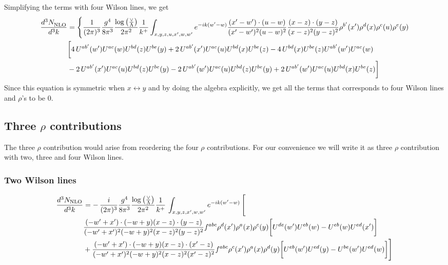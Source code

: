\documentclass[aps,prd,amsmath,amssymb,nofootinbib]{revtex4-2}
\numberwithin{equation}{section}
\begin{document}
Simplifying the terms with four Wilson lines, we get
\begin{align}
       \frac{d^{3}N_{\rm NLO}^{\rm}}{d^{3}k}  & =  \Bigg\{\frac{1}{(2\pi)^{3}}\frac{g^{4}}{8\pi^{3}}\frac{\log{\left(\frac{\vee}{\Lambda}\right)}}{2\pi^{2}} \frac{1}{k^{+}}\int_{x,y,z,u,x^{\prime},w,w^{\prime}}e^{-ik(w^{\prime}-w)}\frac{(x^{\prime}-w^{\prime})\cdot (u-w)}{(x^{\prime}-w^{\prime})^{2} (u-w)^{2}} \frac{(x-z)\cdot (y-z)}{(x-z)^{2}(y-z)^{2}}\rho^{b'}(x') \rho^{d}(x) \rho^{c}(u) \rho^{e}(y)\notag \\ & \bigg[4\,U^{ab'}(w')U^{ac}(w)U^{bd}(z)U^{be}(y)+2\,U^{ab'}(x')U^{ac}(u)U^{bd}(x)U^{be}(z)-4\,U^{bd}(x)U^{be}(z)U^{ab'}(w')U^{ac}(w)\notag \\ & -2\,U^{ab'}(x')U^{ac}(u)U^{bd}(z)U^{be}(y)-2\,U^{ab'}(w')U^{ac}(u)U^{bd}(z)U^{be}(y)+2\,U^{ab'}(w')U^{ac}(u)U^{bd}(x)U^{be}(z)\bigg]
\end{align}
Since this equation is symmetric when $x\leftrightarrow y$ and by doing the algebra explicitly, we get all the terms that corresponds to four Wilson lines and $\rho$'s to be $0$.
\subsection{Three $\rho$ contributions }
The three $\rho$ contribution would arise from reordering the four $\rho$ contributions. For our convenience we will write it as three $\rho$ contribution with two, three and four Wilson lines. 
\subsubsection{Two Wilson lines}
\begin{align}
    \frac{d^{3}N_{\rm NLO}}{d^{3}k} & = -\,\frac{i}{(2\pi)^{3}}\frac{g^{4}}{8\pi^{3}}\frac{\log{\left(\frac{\vee}{\Lambda}\right)}}{2\pi^{2}} \frac{1}{k^{+}}\,\int_{x,y,z,x^{\prime},w,w^{\prime}}e^{-ik(w^{\prime}-w)}\, \Bigg[\notag \\ &  \frac{( - w' + x') \cdot ( - w + y) (x - z) \cdot (y - z)}{( - w' + x')^{2} ( - w + y)^{2} (x - z)^{2} (y - z)^{2}} f^{a b c} \rho^{d}(x') \rho^{a}(x) \rho^{c}(y) \bigg[U^{d e}(w') U^{e b}(w) - U^{e b}(w) U^{e d}(x')\bigg]\nonumber\\
    & + \frac{( - w' + x') \cdot ( - w + y) (x - z) \cdot (x' - z)}{( - w' + x')^{2} ( - w + y)^{2} (x - z)^{2} (x' - z)^{2}} f^{a b c} \rho^{c}(x') \rho^{a}(x) \rho^{d}(y) \bigg[U^{e b}(w') U^{e d}(y) - U^{b e}(w') U^{e d}(w) \bigg]\Bigg]
\end{align}
\end{document}
